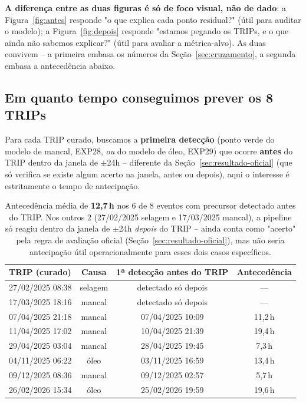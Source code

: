 \documentclass[11pt,a4paper]{article}
\begin{document}
\textbf{A diferença entre as duas figuras é só de foco visual, não de
dado}: a Figura~\ref{fig:antes} responde "o que explica cada ponto
residual?" (útil para auditar o modelo); a Figura~\ref{fig:depois}
responde "estamos pegando os TRIPs, e o que ainda não sabemos
explicar?" (útil para avaliar a métrica-alvo). As duas convivem -- a
primeira embasa os números da Seção~\ref{sec:cruzamento}, a segunda
embasa a antecedência abaixo.

\subsection{Em quanto tempo conseguimos prever os 8 TRIPs}

Para cada TRIP curado, buscamos a \textbf{primeira detecção} (ponto
verde do modelo de mancal, EXP28, \emph{ou} do modelo de óleo, EXP29)
que ocorre \textbf{antes} do TRIP dentro da janela de $\pm$24h --
diferente da Seção~\ref{sec:resultado-oficial} (que só verifica se
existe algum acerto na janela, antes ou depois), aqui o interesse é
estritamente o tempo de antecipação.

\begin{table}[H]
\centering
\begin{tabular}{lccc}
\toprule
\textbf{TRIP (curado)} & \textbf{Causa} & \textbf{1ª detecção antes do TRIP} & \textbf{Antecedência} \\
\midrule
27/02/2025 08:38 & selagem & detectado só depois & --- \\
17/03/2025 18:16 & mancal & detectado só depois & --- \\
07/04/2025 21:18 & mancal & 07/04/2025 10:09 & 11,2\,h \\
11/04/2025 17:02 & mancal & 10/04/2025 21:39 & 19,4\,h \\
29/04/2025 03:04 & mancal & 28/04/2025 19:45 & 7,3\,h \\
04/11/2025 06:22 & óleo & 03/11/2025 16:59 & 13,4\,h \\
09/12/2025 08:36 & mancal & 09/12/2025 02:57 & 5,7\,h \\
26/02/2026 15:34 & óleo & 25/02/2026 19:59 & 19,6\,h \\
\bottomrule
\end{tabular}
\caption{Antecedência média de \textbf{12,7\,h} nos 6 de 8 eventos com
precursor detectado antes do TRIP. Nos outros 2 (27/02/2025 selagem e
17/03/2025 mancal), a pipeline só reagiu dentro da janela de
$\pm$24h \emph{depois} do TRIP -- ainda conta como "acerto" pela
regra de avaliação oficial (Seção~\ref{sec:resultado-oficial}), mas
não seria antecipação útil operacionalmente para esses dois casos
específicos.}
\end{table}
\end{document}
